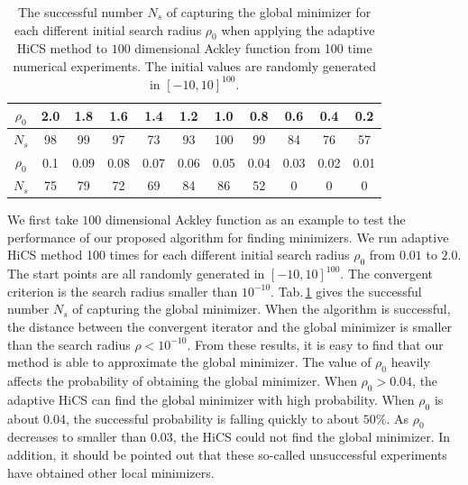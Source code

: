 \documentclass[final,1p,times]{elsarticle}
\begin{document}
\begin{table}[!hbpt]
\caption{
The successful number $N_s$ of capturing the global minimizer for
each different initial search radius $\rho_0$ when applying the
adaptive HiCS method to $100$ dimensional Ackley function from 100
time numerical experiments. 
The initial values are randomly generated in $[-10,10]^{100}$.
}
\label{tab:ackley100D:AHiCS}
\begin{center}
\begin{tabular}{|c|c|c|c|c|c|c|c|c|c|c|}
 \hline
  $\rho_0$  & 2.0 & 1.8 & 1.6 & 1.4 & 1.2 & 1.0 & 0.8 & 0.6 & 0.4 & 0.2 
 \\\hline
  $N_s$     & 98  & 99  & 97  & 73  & 93  & 100 & 99  & 84  & 76 & 57 
\\\hline \hline
 $\rho_0$ & 0.1 & 0.09 & 0.08 & 0.07 & 0.06 & 0.05 & 0.04 & 0.03& 0.02 & 0.01
 \\\hline
  $N_s$& 75 & 79 & 72 & 69 & 84 &86 & 52 & 0 & 0 & 0
\\ \hline
\end{tabular}
\end{center}
\end{table}
We first take $100$ dimensional Ackley function as an example to
test the performance of our proposed algorithm for finding minimizers. 
We run adaptive HiCS method 100 times for each different initial
search radius $\rho_0$ from $0.01$ to $2.0$.
The start points are all randomly generated in $[-10,10]^{100}$.
The convergent criterion is the search radius smaller than $10^{-10}$.
Tab.\,\ref{tab:ackley100D:AHiCS} gives the successful number
$N_s$ of capturing the global minimizer.  
When the algorithm is successful, the distance between the
convergent iterator and the global minimizer is smaller than the
search radius $\rho < 10^{-10}$.
From these results, it is easy to find that our method is able to
approximate the global minimizer. 
The value of $\rho_0$ heavily affects the probability of
obtaining the global minimizer. 
When $\rho_0 > 0.04$, the adaptive HiCS can find the global
minimizer with high probability. 
When $\rho_0$ is about $0.04$, 
the successful probability is falling quickly to about $50\%$. 
As $\rho_0$ decreases to smaller than $0.03$, the HiCS could not
find the global minimizer.
In addition, it should be pointed out that these so-called unsuccessful
experiments have obtained other local minimizers. 
\end{document}
